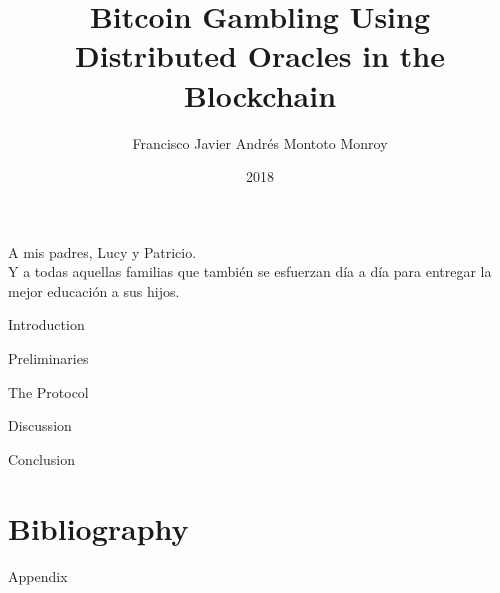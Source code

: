 \documentclass[upright,contnum]{umemoria}
\author{Francisco Javier Andr\'es Montoto Monroy}
\title{Bitcoin Gambling Using Distributed Oracles in the Blockchain}
\date{2018}
\begin{document}
\frontmatter
\maketitle

\begin{abstract}
    
\end{abstract}
\begin{abstract}
	
\end{abstract}
\begin{dedicatoria}%
	A mis padres, Lucy y Patricio. \\
    \footnotesize{Y a todas aquellas familias que tambi\'en se esfuerzan d\'ia a d\'ia
                  para entregar la mejor educaci\'on a sus hijos.}
\end{dedicatoria}

\begin{thanks} %
    
\end{thanks}
\cleardoublepage
{}
\tableofcontents
\listoftables %
\listoffigures %

\mainmatter

\begin{my_section}{Introduction}
	
\end{my_section}

\begin{my_section}{Preliminaries}
    
	
	
	
	
	
\end{my_section}

\begin{my_section}{The Protocol}
    
    
	
	
	
	
    
	
    
\end{my_section}

\begin{my_section}{Discussion}
    
	
    
    
    
    
    
\end{my_section}

\begin{my_section}{Conclusion}
	
\end{my_section}

\chapter{Bibliography}
\printbibliography[heading=none]

\begin{my_section}{Appendix}
    
    
\end{my_section}
\end{document}
